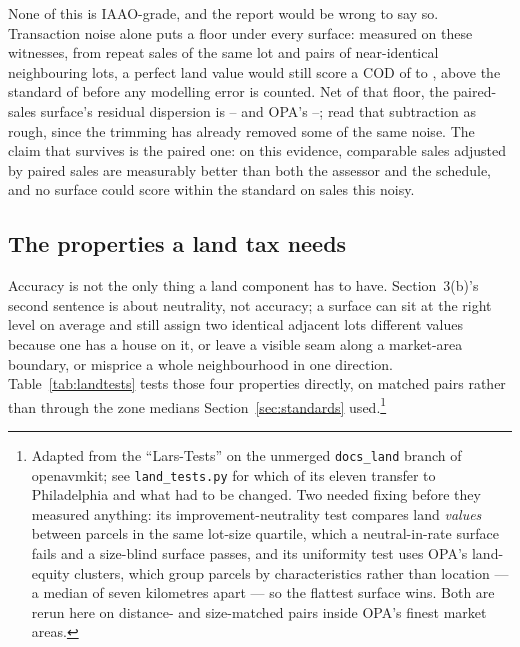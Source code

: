 \documentclass[11pt]{article}
\begin{document}
None of this is IAAO-grade, and the report would be wrong to say so. Transaction noise alone
puts a floor under every surface: measured on these witnesses, from \LycdNoiseRepeatPairs{}
repeat sales of the same lot and \LycdNoiseNeighbourPairs{} pairs of near-identical neighbouring
lots, a perfect land value would still score a COD of \LycdNoiseCodLo{} to \LycdNoiseCodHi{},
above the standard of \LycdIaaoCod{} before any modelling error is counted. Net of that floor,
the paired-sales surface's residual dispersion is \LycdSfiveNetLo{}--\LycdSfiveNetHi{} and OPA's
\LycdSzeroNetLo{}--\LycdSzeroNetHi{}; read that subtraction as rough, since the trimming has
already removed some of the same noise. The claim that survives is the paired one: on this
evidence, comparable sales adjusted by paired sales are measurably better than both the
assessor and the schedule, and no surface could score within the standard on sales this noisy.

\subsection{The properties a land tax needs}\label{sec:landtests}

\begin{table}[t]
  \centering
  \caption{Four tests a ratio study cannot perform. T1 pairs each vacant lot with the nearest
  built parcel in the same market area, within \LycdTPairRadiusM\,m and \LycdTSizeMatchPct{}
  on lot area, and asks whether their land rates agree within \LycdTNeutralityTolPct{}. T2 is
  the dispersion of land \$/sqft inside a market area. T3 compares neighbouring parcels across
  a cell boundary against pairs inside one cell, counting a pair smooth when their rates
  differ by less than \LycdTSmoothJumpPct{}. T4 is Moran's $I$ over the land sales' ratio
  residuals; positive means errors cluster by neighbourhood.}
  \label{tab:landtests}
  {\small}
\end{table}

Accuracy is not the only thing a land component has to have. Section~3(b)'s second sentence is
about neutrality, not accuracy; a surface can sit at the right level on average and still
assign two identical adjacent lots different values because one has a house on it, or leave a
visible seam along a market-area boundary, or misprice a whole neighbourhood in one direction.
Table~\ref{tab:landtests} tests those four properties directly, on matched pairs rather than
through the zone medians Section~\ref{sec:standards} used.\footnote{Adapted from the
``Lars-Tests'' on the unmerged \texttt{docs\_land} branch of openavmkit; see
\texttt{land\_tests.py} for which of its eleven transfer to Philadelphia and what had to be
changed. Two needed fixing before they measured anything: its improvement-neutrality test
compares land \emph{values} between parcels in the same lot-size quartile, which a
neutral-in-rate surface fails and a size-blind surface passes, and its uniformity test uses
OPA's land-equity clusters, which group parcels by characteristics rather than location --- a
median of seven kilometres apart --- so the flattest surface wins. Both are rerun here on
distance- and size-matched pairs inside OPA's finest market areas.}
\end{document}
